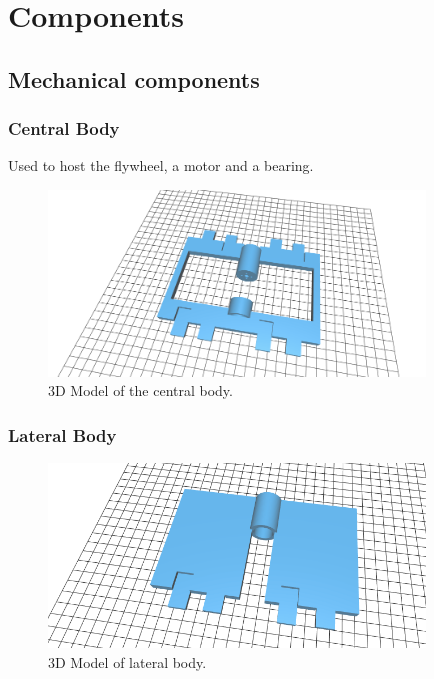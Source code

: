 \section{Components}

\subsection{Mechanical components}
\subsubsection{Central Body}

Used to host the flywheel, a motor and a bearing.
\begin{figure}[H]
    \centering
    \includegraphics[width=10cm]{img/components/central_body.png}
    \caption{3D Model of the central body.}
    \label{fig:}
\end{figure}
\subsubsection{Lateral Body}
\begin{figure}[H]
    \centering
    \includegraphics[width=10cm]{img/components/lateral_body.png}
    \caption{3D Model of lateral body.}
    \label{fig:}
\end{figure}
